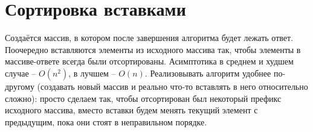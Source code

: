 \section{Сортировка вставками}
Создаётся массив, в котором после завершения алгоритма будет лежать ответ. Поочередно вставляются элементы из исходного массива так, чтобы элементы в массиве-ответе всегда были отсортированы. Асимптотика в среднем и худшем случае – $O(n^2)$, в лучшем – $O(n)$. Реализовывать алгоритм удобнее по-другому (создавать новый массив и реально что-то вставлять в него относительно сложно): просто сделаем так, чтобы отсортирован был некоторый префикс исходного массива, вместо вставки будем менять текущий элемент с предыдущим, пока они стоят в неправильном порядке. \cite{teoriya}
